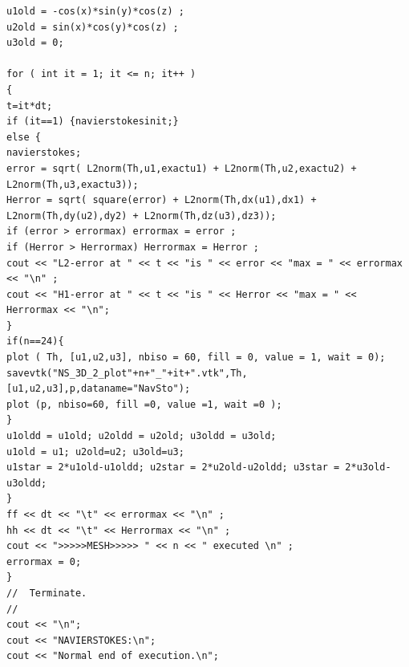 \documentclass[a4paper,10pt]{article}
\begin{document}
\begin{lstlisting}
u1old = -cos(x)*sin(y)*cos(z) ;
u2old = sin(x)*cos(y)*cos(z) ;
u3old = 0;

for ( int it = 1; it <= n; it++ )
{
t=it*dt;
if (it==1) {navierstokesinit;}
else {
navierstokes;
error = sqrt( L2norm(Th,u1,exactu1) + L2norm(Th,u2,exactu2) + L2norm(Th,u3,exactu3));
Herror = sqrt( square(error) + L2norm(Th,dx(u1),dx1) + L2norm(Th,dy(u2),dy2) + L2norm(Th,dz(u3),dz3));
if (error > errormax) errormax = error ;
if (Herror > Herrormax) Herrormax = Herror ;
cout << "L2-error at " << t << "is " << error << "max = " << errormax << "\n" ;
cout << "H1-error at " << t << "is " << Herror << "max = " << Herrormax << "\n"; 
}
if(n==24){
plot ( Th, [u1,u2,u3], nbiso = 60, fill = 0, value = 1, wait = 0);
savevtk("NS_3D_2_plot"+n+"_"+it+".vtk",Th,[u1,u2,u3],p,dataname="NavSto");
plot (p, nbiso=60, fill =0, value =1, wait =0 );
}
u1oldd = u1old; u2oldd = u2old; u3oldd = u3old; 
u1old = u1; u2old=u2; u3old=u3;
u1star = 2*u1old-u1oldd; u2star = 2*u2old-u2oldd; u3star = 2*u3old-u3oldd;
}
ff << dt << "\t" << errormax << "\n" ;
hh << dt << "\t" << Herrormax << "\n" ;
cout << ">>>>>MESH>>>>> " << n << " executed \n" ;
errormax = 0;
}
//  Terminate.
//
cout << "\n";
cout << "NAVIERSTOKES:\n";
cout << "Normal end of execution.\n";
\end{lstlisting}

\end{document}
